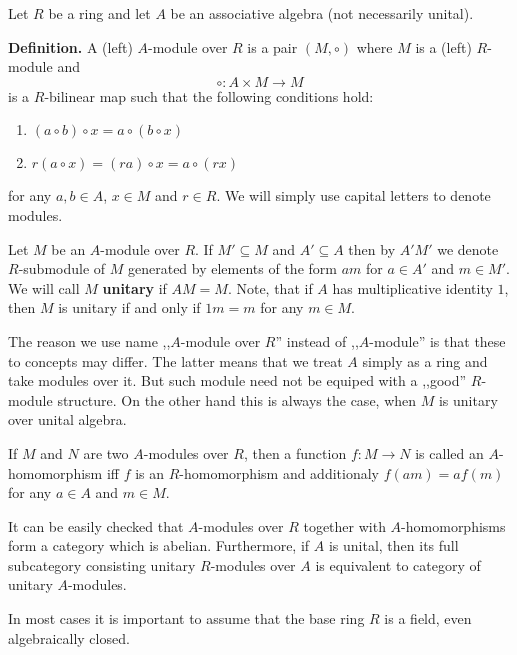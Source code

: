 \documentclass[12pt]{article}
\begin{document}
Let $R$ be a ring and let $A$ be an associative algebra (not necessarily unital).

\textbf{Definition.} A (left) $A$-module over $R$ is a pair $(M,\circ)$ where $M$ is a (left) $R$-module and
$$\circ:A\times M\to M$$
is a $R$-bilinear map such that the following conditions hold:
\begin{enumerate}
\item $(a\circ b)\circ x=a\circ(b\circ x)$
\item $r(a\circ x)=(ra)\circ x=a\circ(rx)$
\end{enumerate}
for any $a,b\in A$, $x\in M$ and $r\in R$. We will simply use capital letters to denote modules.

Let $M$ be an $A$-module over $R$. If $M'\subseteq M$ and $A'\subseteq A$ then by $A'M'$ we denote $R$-submodule of $M$ generated by elements of the form $am$ for $a\in A'$ and $m\in M'$. We will call $M$ \textbf{unitary} if $AM=M$. Note, that if $A$ has multiplicative identity $1$, then $M$ is unitary if and only if $1m=m$ for any $m\in M$.

The reason we use name ,,$A$-module over $R$'' instead of ,,$A$-module'' is that these to concepts may differ. The latter means that we treat $A$ simply as a ring and take modules over it. But such module need not be equiped with a ,,good'' $R$-module structure. On the other hand this is always the case, when $M$ is unitary over unital algebra.

If $M$ and $N$ are two $A$-modules over $R$, then a function $f:M\to N$ is called an $A$-homomorphism iff $f$ is an $R$-homomorphism and additionaly $f(am)=af(m)$ for any $a\in A$ and $m\in M$.

It can be easily checked that $A$-modules over $R$ together with $A$-homomorphisms form a category which is abelian. Furthermore, if $A$ is unital, then its full subcategory consisting unitary $R$-modules over $A$ is equivalent to category of unitary $A$-modules.

In most cases it is important to assume that the base ring $R$ is a field, even algebraically closed.
\end{document}
